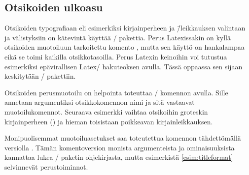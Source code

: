 \subsection{Otsikoiden ulkoasu}
\label{luku:otsikot_ulkoasu}

Otsikoiden typografiaan eli esimerkiksi kirjainperheen ja \=/leikkauksen
valintaan ja välistyksiin on kätevintä käyttää \-/
pakettia. Perus Latexissakin on kyllä otsikoiden
muotoiluun tarkoitettu komento , mutta sen
käyttö on hankalampaa eikä se toimi kaikilla otsikkotasoilla. Perus
Latexin keinoihin voi tutustua esimerkiksi epävirallisen Latex\-/
hakuteoksen \textcite{unoffref} avulla. Tässä oppaassa sen sijaan
keskitytään \-/ pakettiin.

Otsikoiden perusmuotoilu on helpointa toteuttaa
\-/ komennon avulla. Sille annetaan argumentiksi
otsikkokomennon nimi ja sitä vastaavat muotoilukomennot. Seuraava
esimerkki vaihtaa otsikoihin groteskin kirjainperheen
() ja hieman toisistaan poikkeavan kirjainleikkauksen.

\begin{koodilohkosis}
\titleformat*{\section}      {\sffamily\bfseries\Large}
\titleformat*{\subsection}   {\sffamily\bfseries\itshape\large}
\titleformat*{\subsubsection}{\sffamily\bfseries\normalsize}
\end{koodilohkosis}

Monipuolisemmat muotoiluasetukset saa toteutettua komennon tähdettömällä
versiolla . Tämän komentoversion monista
argumenteista ja ominaisuuksista kannattaa lukea \-/
paketin ohjekirjasta, mutta esimerkistä \ref{esim:titleformat}
selvinnevät perustoiminnot.

